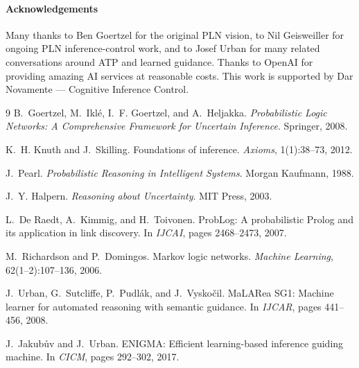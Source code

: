\documentclass{easychair}
\begin{document}
\vspace{-3mm}
\paragraph*{Acknowledgements}
Many thanks to Ben Goertzel for the original PLN vision, to Nil Geisweiller for ongoing PLN inference-control work, and to Josef Urban for many related conversations around ATP and learned guidance.
Thanks to OpenAI for providing amazing AI services at reasonable costs.
This work is supported by Dar Novamente --- Cognitive Inference Control.

\newpage

\begin{thebibliography}{9}
B.~Goertzel, M.~Ikl\'{e}, I.~F. Goertzel, and A.~Heljakka.
\newblock \emph{Probabilistic Logic Networks: A Comprehensive Framework for Uncertain Inference}.
\newblock Springer, 2008.

K.~H. Knuth and J.~Skilling.
\newblock Foundations of inference.
\newblock \emph{Axioms}, 1(1):38--73, 2012.

J.~Pearl.
\newblock \emph{Probabilistic Reasoning in Intelligent Systems}.
\newblock Morgan Kaufmann, 1988.

J.~Y. Halpern.
\newblock \emph{Reasoning about Uncertainty}.
\newblock MIT Press, 2003.

L.~De Raedt, A.~Kimmig, and H.~Toivonen.
\newblock ProbLog: A probabilistic Prolog and its application in link discovery.
\newblock In \emph{IJCAI}, pages 2468--2473, 2007.

M.~Richardson and P.~Domingos.
\newblock Markov logic networks.
\newblock \emph{Machine Learning}, 62(1--2):107--136, 2006.

J.~Urban, G.~Sutcliffe, P.~Pudl\'{a}k, and J.~Vysko\v{c}il.
\newblock MaLARea SG1: Machine learner for automated reasoning with semantic guidance.
\newblock In \emph{IJCAR}, pages 441--456, 2008.

J.~Jakub\r{u}v and J.~Urban.
\newblock ENIGMA: Efficient learning-based inference guiding machine.
\newblock In \emph{CICM}, pages 292--302, 2017.
\end{thebibliography}
\end{document}
